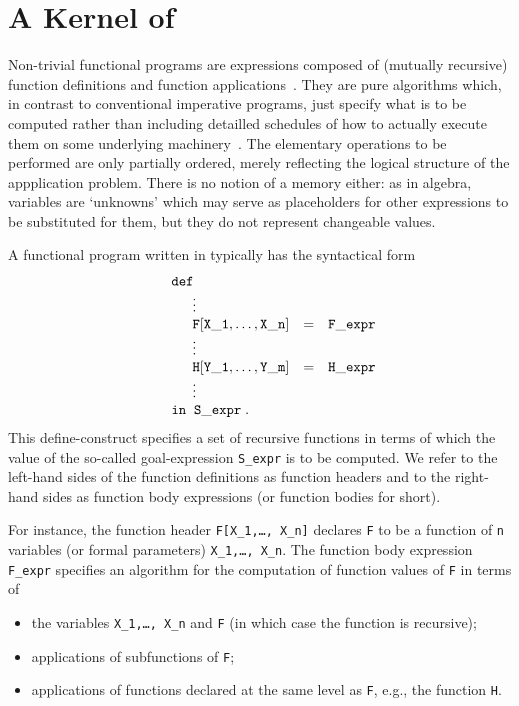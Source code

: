 \section{A Kernel of \kir}

Non-trivial functional programs are {\mys expressions} composed of 
(mutually recursive) {\mys function definitions} and {\mys function applications}~\cite{abel85,macq87,bird88}.
They are {\mys pure algorithms} which, in contrast
to conventional imperative programs, just specify what is to be
computed rather than including detailled schedules of how to actually
execute them on some underlying machinery~\cite{back78}. 
The elementary operations to be performed are only partially ordered,
merely reflecting the 
logical structure of the appplication
problem. There is no notion of a memory either: as in algebra, 
variables are `unknowns' which may serve
as placeholders for other expressions to be substituted
for them, but they do not represent changeable values. 

A functional program written in \kir typically has the syntactical form
$$
\begin{array}{lclcl}
&& {\tt def}
\\
&& \phantom{{\sc in}\;\;}\vdots
\\
&& \phantom{{\sc in}\;\;}{\tt F[X\_1, \ldots, X\_n]}&=&{\tt F\_expr}
\\
&& \phantom{{\sc in}\;\;}\vdots\\
&& \phantom{{\sc in}\;\;}{\tt H[Y\_1, \ldots, Y\_m]}&=&{\tt H\_expr}
\\
&& \phantom{{\sc in}\;\;}\vdots \\
&& {\tt in\;\; S\_expr\;}.
\end{array}
$$
This {\sc define}-construct specifies a set of {\mys recursive functions}
in terms of which the value of the so-called {\mys goal-expression}
{\tt S\_expr} is to be computed.
We refer to the left-hand sides of the function
definitions as {\mys function headers}
and to the right-hand sides as {\mys function body
expressions} (or {\mys function bodies} for short).

For instance,
the function header {\tt F[X\_1,\ldots, X\_n]} declares {\tt F} to be a
function of {\tt n} {\mys variables}
(or {\mys formal parameters})
{\tt X\_1,\ldots, X\_n}. The function body
expression {\tt F\_expr}
specifies an algorithm for the computation of {\mys function
values} of {\tt F} in terms of
\begin{itemize}
\item the variables {\tt X\_1,\ldots, X\_n} and {\tt F} (in which case the
function is recursive);
\item applications of subfunctions of {\tt F};
\item applications of functions declared at the same level as {\tt F},
e.g., the function {\tt H}.
\end{itemize}

